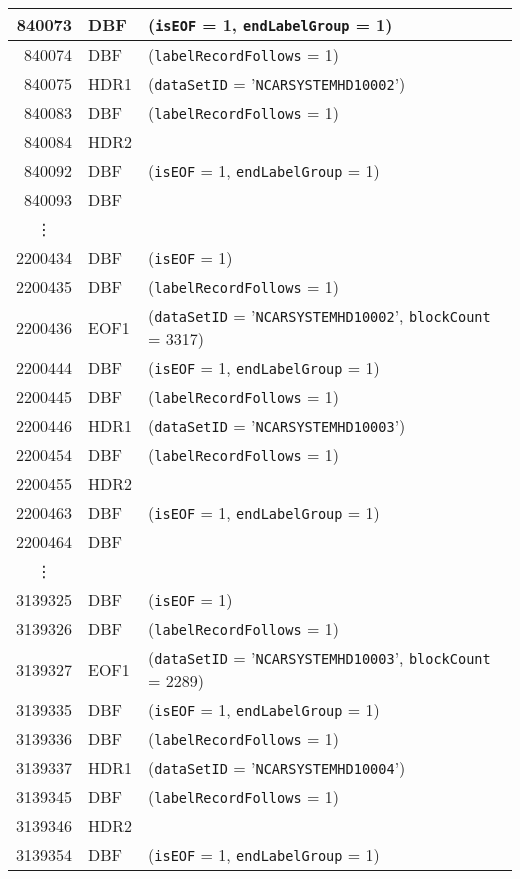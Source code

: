 \documentclass{report}
\begin{document}
\begin{center}
\begin{longtable}{rll}
 840073 & DBF  & (\texttt{isEOF} = 1, \texttt{endLabelGroup} = 1) \\
\hline
 840074 & DBF  & (\texttt{labelRecordFollows} = 1) \\
 840075 & HDR1 & (\texttt{dataSetID} = '\texttt{NCARSYSTEMHD10002}') \\
 840083 & DBF  & (\texttt{labelRecordFollows} = 1) \\
 840084 & HDR2 & \\
 840092 & DBF  & (\texttt{isEOF} = 1, \texttt{endLabelGroup} = 1) \\
\hline
 840093 & DBF  & \\
\multicolumn{1}{c}{\vdots} \\
2200434 & DBF  & (\texttt{isEOF} = 1) \\
\hline
2200435 & DBF  & (\texttt{labelRecordFollows} = 1) \\
2200436 & EOF1 & (\texttt{dataSetID} = '\texttt{NCARSYSTEMHD10002}', \texttt{blockCount} = 3317) \\
2200444 & DBF  & (\texttt{isEOF} = 1, \texttt{endLabelGroup} = 1) \\
\hline
2200445 & DBF  & (\texttt{labelRecordFollows} = 1) \\
2200446 & HDR1 & (\texttt{dataSetID} = '\texttt{NCARSYSTEMHD10003}') \\
2200454 & DBF  & (\texttt{labelRecordFollows} = 1) \\
2200455 & HDR2 & \\
2200463 & DBF  & (\texttt{isEOF} = 1, \texttt{endLabelGroup} = 1) \\
\hline
2200464 & DBF  & \\
\multicolumn{1}{c}{\vdots} \\
3139325 & DBF  & (\texttt{isEOF} = 1) \\
\hline
3139326 & DBF  & (\texttt{labelRecordFollows} = 1) \\
3139327 & EOF1 & (\texttt{dataSetID} = '\texttt{NCARSYSTEMHD10003}', \texttt{blockCount} = 2289) \\
3139335 & DBF  & (\texttt{isEOF} = 1, \texttt{endLabelGroup} = 1) \\
\hline
3139336 & DBF  & (\texttt{labelRecordFollows} = 1) \\
3139337 & HDR1 & (\texttt{dataSetID} = '\texttt{NCARSYSTEMHD10004}') \\
3139345 & DBF  & (\texttt{labelRecordFollows} = 1) \\
3139346 & HDR2 & \\
3139354 & DBF  & (\texttt{isEOF} = 1, \texttt{endLabelGroup} = 1) \\

\end{longtable}
\end{center}
\end{document}
